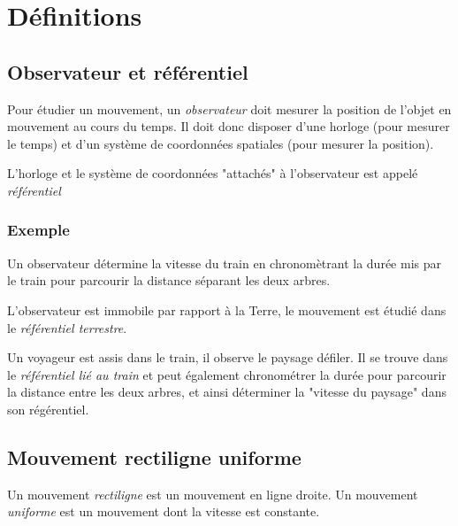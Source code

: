 

\section{Définitions}
  \subsection{Observateur et référentiel}

Pour étudier un mouvement, un {\it observateur} doit mesurer la position de l'objet en mouvement au cours du temps. Il doit donc disposer d'une horloge (pour mesurer le temps) et d'un système de coordonnées spatiales (pour mesurer la position).

L'horloge et le système de coordonnées "attachés" à l'observateur est appelé {\it référentiel}


    \subsubsection{Exemple}
Un observateur détermine la vitesse du train en chronomètrant la durée mis par le train pour parcourir la distance séparant les deux arbres.

\begin{center}
%

\end{center}

L'observateur est immobile par rapport à la Terre, le mouvement est étudié dans le {\it référentiel terrestre}.

Un voyageur est assis dans le train, il observe le paysage défiler. Il se trouve dans le {\it référentiel lié au train} et peut également chronométrer la durée pour parcourir la distance entre les deux arbres, et ainsi déterminer la "vitesse du paysage" dans son régérentiel.


  \subsection{Mouvement rectiligne uniforme}

Un mouvement {\it rectiligne} est un mouvement en ligne droite. Un mouvement {\it uniforme} est un mouvement dont la vitesse est constante.





